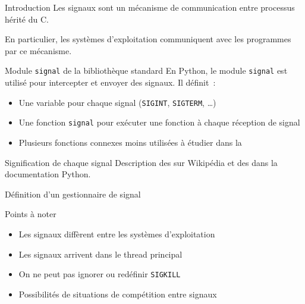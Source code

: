 \begin{frame}{Introduction}
  Les signaux sont un mécanisme de communication entre processus hérité du C.

  En particulier, les systèmes d'exploitation communiquent avec les programmes par ce mécanisme.
\end{frame}

\begin{frame}{Module \texttt{signal} de la bibliothèque standard}
  En Python, le module \texttt{signal} est utilisé pour intercepter et envoyer des signaux. Il définit~:

  \begin{itemize}[<+(1)->]
    \item Une variable pour chaque signal (\texttt{SIGINT}, \texttt{SIGTERM}, …)
    \item Une fonction \texttt{signal} pour exécuter une fonction à chaque réception de signal
    \item Plusieurs fonctions connexes moins utilisées à étudier dans la 
  \end{itemize}
\end{frame}

\begin{frame}{Signification de chaque signal}
  Description des  sur Wikipédia et des  dans la documentation Python.
\end{frame}

\begin{frame}{Définition d'un gestionnaire de signal}
\end{frame}

\begin{frame}{Points à noter}
  \begin{itemize}[<+->]
    \item Les signaux diffèrent entre les systèmes d'exploitation
    \item Les signaux arrivent dans le thread principal
    \item On ne peut pas ignorer ou redéfinir \texttt{SIGKILL}
    \item Possibilités de situations de compétition entre signaux
  \end{itemize}
\end{frame}

